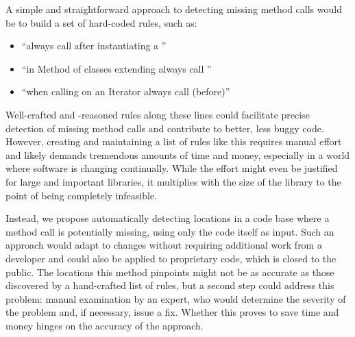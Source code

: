 A simple and straightforward approach to detecting missing method calls would be to build a set of hard-coded rules, such as:
\begin{itemize}
    \item ``always call  after instantiating a ''
    \item ``in Method  of classes extending  always call ''
    \item ``when calling  on an Iterator always call  (before)''
\end{itemize}
Well-crafted and -reasoned rules along these lines could facilitate precise detection of missing method calls and contribute to better, less buggy code.
However, creating and maintaining a list of rules like this requires manual effort and likely demands tremendous amounts of time and money, especially in a world where software is changing continually.
While the effort might even be justified for large and important libraries, it multiplies with the size of the library to the point of being completely infeasible.

Instead, we propose automatically detecting locations in a code base where a method call is potentially missing, using only the code itself as input.
Such an approach would adapt to changes without requiring additional work from a developer and could also be applied to proprietary code, which is closed to the public.
The locations this method pinpoints might not be as accurate as those discovered by a hand-crafted list of rules, but a second step could address this problem: manual examination by an expert, who would determine the severity of the problem and, if necessary, issue a fix.
Whether this proves to save time and money hinges on the accuracy of the approach.



